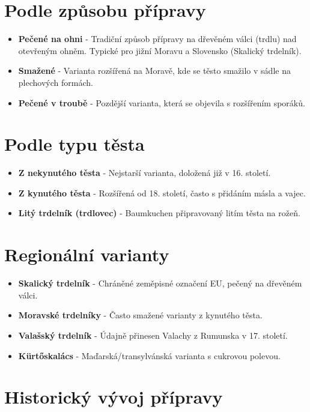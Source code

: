 \documentclass[a5paper,10pt]{book}
\begin{document}
\section{Podle způsobu přípravy}
\begin{itemize}
  \item \textbf{Pečené na ohni} - Tradiční způsob přípravy na dřevěném válci (trdlu) nad otevřeným ohněm. Typické pro jižní Moravu a Slovensko (Skalický trdelník).
  \item \textbf{Smažené} - Varianta rozšířená na Moravě, kde se těsto smažilo v sádle na plechových formách.
  \item \textbf{Pečené v troubě} - Pozdější varianta, která se objevila s rozšířením sporáků.
\end{itemize}

\section{Podle typu těsta}
\begin{itemize}
  \item \textbf{Z nekynutého těsta} - Nejstarší varianta, doložená již v 16. století.
  \item \textbf{Z kynutého těsta} - Rozšířená od 18. století, často s přidáním másla a vajec.
  \item \textbf{Litý trdelník (trdlovec)} - Baumkuchen připravovaný litím těsta na rožeň.
\end{itemize}

\section{Regionální varianty}
\begin{itemize}
  \item \textbf{Skalický trdelník} - Chráněné zeměpisné označení EU, pečený na dřevěném válci.
  \item \textbf{Moravské trdelníky} - Často smažené varianty z kynutého těsta.
  \item \textbf{Valašský trdelník} - Údajně přinesen Valachy z Rumunska v 17. století.
  \item \textbf{Kürtőskalács} - Maďarská/transylvánská varianta s cukrovou polevou.
\end{itemize}

\section{Historický vývoj přípravy}
\end{document}
